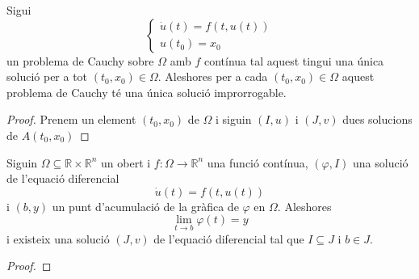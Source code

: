 \documentclass[../../Main.tex]{subfiles}
\begin{document}
	\begin{proposition}
		\label{prop:la solució improrrogable és única}
		Sigui
		\[\begin{cases}
			\displaystyle \dot{u}(t)=f(t,u(t)) \\
			\displaystyle u(t_{0})=x_{0}
		\end{cases}\]
		un problema de Cauchy sobre \(\Omega\) amb \(f\) contínua tal aquest tingui una única solució per a tot \((t_{0},x_{0})\in\Omega\).
		Aleshores per a cada \((t_{0},x_{0})\in\Omega\) aquest problema de Cauchy té una única solució improrrogable.
		\begin{proof}
			Prenem un element \((t_{0},x_{0})\) de \(\Omega\) i siguin \((I,u)\) i \((J,v)\) dues solucions de \(A(t_{0},x_{0})\)
		\end{proof}
	\end{proposition}
	\begin{theorem}
		\label{thm:Lema de Wintner}
		Siguin \(\Omega\subseteq\mathbb{R}\times\mathbb{R}^{n}\) un obert i \(f\colon\Omega\longrightarrow\mathbb{R}^{n}\) una funció contínua, \((\varphi,I)\) una solució de l'equació diferencial
		\[
		    \dot{u}(t)=f(t,u(t))
		\]
		i \((b,y)\) un punt d'acumulació de la gràfica de \(\varphi\) en \(\Omega\).
		Aleshores
		\[
		    \lim_{t\to b}\varphi(t)=y
		\]
		i existeix una solució \((J,v)\) de l'equació diferencial tal que \(I\subseteq J\) i \(b\in J\).
		\begin{proof}
		\end{proof}
	\end{theorem}
\end{document}
